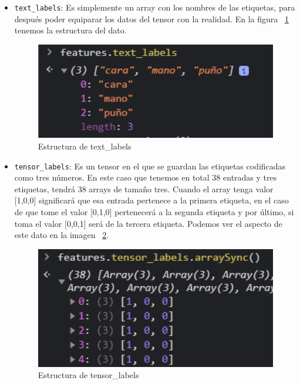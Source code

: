 \documentclass[a4paper, 12pt]{book}
\begin{document}
\begin{itemize}
  
	\item \texttt{text\_labels}: Es simplemente un array con los nombres de las etiquetas, para después poder equiparar los datos del tensor con la realidad. En la figura ~\ref{fig:textlabels} tenemos la estructura del dato.

\begin{figure}
	\centering
	\includegraphics[width=12cm, keepaspectratio]{img/textlabels}
	\caption{Estructura de text\_labels}				
	\label{fig:textlabels}
\end{figure}

	\item \texttt{tensor\_labels}: Es un tensor en el que se guardan las etiquetas codificadas como tres números. En este caso que tenemos en total 38 entradas y tres etiquetas, tendrá 38 arrays de tamaño tres. Cuando el array tenga valor [1,0,0] significará que esa entrada pertenece a la primera etiqueta, en el caso de que tome el valor [0,1,0] pertenecerá a la segunda etiqueta y por último, si toma el valor [0,0,1] será de la tercera etiqueta. Podemos ver el aspecto de este dato en la imagen ~\ref{fig:tensorlabels}.

\begin{figure}
	\centering
	\includegraphics[width=12cm, keepaspectratio]{img/tensorlabels}
	\caption{Estructura de tensor\_labels}				
	\label{fig:tensorlabels}
\end{figure}
	

\end{itemize}
\end{document}
